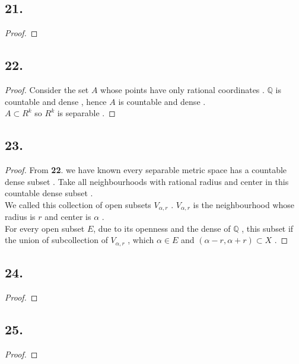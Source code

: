 \documentclass{report}
\begin{document}
            \subsection*{21.}
                \begin{proof}

                \end{proof}
            \subsection*{22.}
                \begin{proof}
                    Consider the set $A$ whose points have only rational coordinates . $\mathbb{Q}$ is countable and dense , hence $A$ is countable and dense .\\
                    $A \subset R^k$ so $R^k$ is separable .
                \end{proof}
            \subsection*{23.}
                \begin{proof}
                    From \textbf{22}. we have known every separable metric space has a countable dense subset .
                    Take all neighbourhoods with rational radius and center in this countable dense subset .\\ 
                    We called this collection of open subsets {$V_{\alpha,r}$} . $V_{\alpha,r}$ is the neighbourhood whose radius is $r$ and center is $\alpha$ .\\
                    For every open subset $E$, due to its openness and the dense of $\mathbb{Q}$ ,
                    this subset if the union of subcollection of {$V_{\alpha,r}$} , which $\alpha \in E$ and $(\alpha -r , \alpha +r) \subset X$ .               
                \end{proof}
            \subsection*{24.}
                \begin{proof}

                \end{proof}
            \subsection*{25.}
                \begin{proof}
                    
                \end{proof}
\end{document}
